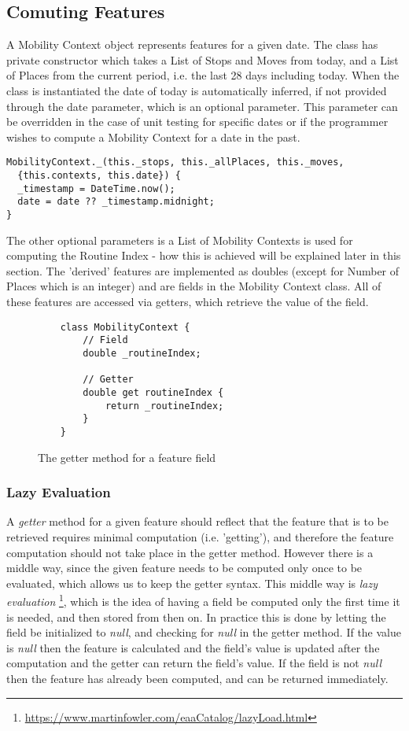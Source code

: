\subsection{Comuting Features}
A Mobility Context object represents features for a given date. The class has private constructor which takes a List of Stops and Moves from today, and a List of Places from the current period, i.e. the last 28 days including today. When the class is instantiated the date of today is automatically inferred, if not provided through the date parameter, which is an optional parameter. This parameter can be overridden in the case of unit testing for specific dates or if the programmer wishes to compute a Mobility Context for a date in the past.

\begin{verbatim}
MobilityContext._(this._stops, this._allPlaces, this._moves,
  {this.contexts, this.date}) {
  _timestamp = DateTime.now();
  date = date ?? _timestamp.midnight;
}
\end{verbatim}

The other optional parameters is a List of Mobility Contexts is used for computing the Routine Index - how this is achieved will be explained later in this section. The 'derived' features are implemented as doubles (except for Number of Places which is an integer) and are fields in the Mobility Context class. All of these features are accessed via getters, which retrieve the value of the field.

\begin{figure}
    \centering
    \begin{verbatim}
    class MobilityContext {
    	// Field
    	double _routineIndex;
     
     	// Getter
        double get routineIndex {
        	return _routineIndex;
        }
    }
    \end{verbatim}
    \caption{The getter method for a feature field}
    \label{fig:feature-getter}
\end{figure}

\subsubsection{Lazy Evaluation}
A \textit{getter} method for a given feature should reflect that the feature that is to be retrieved requires minimal computation (i.e. 'getting'), and therefore the feature computation should not take place in the getter method. However there is a middle way, since the given feature needs to be computed only once to be evaluated, which allows us to keep the getter syntax. This middle way is \textit{lazy evaluation} \footnote{\url{https://www.martinfowler.com/eaaCatalog/lazyLoad.html}}, which is the idea of having a field be computed only the first time it is needed, and then stored from then on. In practice this is done by letting the field be initialized to \textit{null}, and checking for \textit{null} in the getter method. If the value is \textit{null} then the feature is calculated and the field's value is updated after the computation and the getter can return the field's value. If the field is not \textit{null} then the feature has already been computed, and can be returned immediately.

